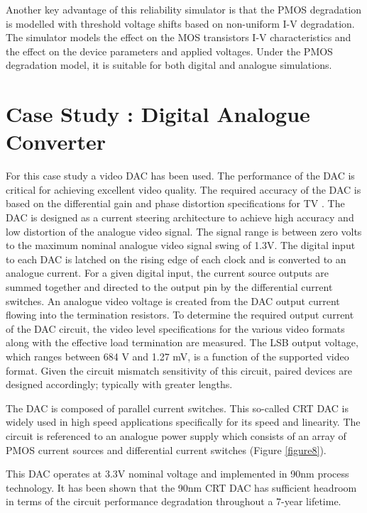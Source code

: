 \documentclass[11pt,a4paper]{article}
\begin{document}
Another key advantage of this reliability simulator is that the PMOS degradation is modelled with threshold voltage shifts based on  non-uniform I-V degradation. The simulator  models the effect on the MOS transistors I-V characteristics  and the effect on the device parameters and applied voltages. Under the PMOS degradation model, it is suitable for both  digital and analogue simulations.


\section{Case Study : Digital Analogue Converter}




For this case study a video DAC has been used. The performance of the DAC is critical for achieving excellent video quality. The required accuracy of the DAC is based on the differential gain and phase distortion specifications for TV \cite{Wu}. The DAC is designed as a current steering architecture to achieve high accuracy and low distortion of the analogue video signal. The signal range is between zero volts to the maximum nominal analogue video signal swing of 1.3V. The digital input to each DAC is latched on the rising edge of each clock and is converted to an analogue current. For a given digital input, the current source outputs are summed together and directed to the output pin by the differential current switches. An analogue video voltage is created from the DAC output current flowing into the termination resistors. To determine the required output current of the DAC circuit, the video level specifications for the various video formats along with the effective load termination are measured. The LSB output voltage, which ranges between 684 V and 1.27 mV, is a function of the supported video format.
Given the circuit mismatch sensitivity of this circuit, paired devices are designed accordingly; typically with greater lengths. 

The DAC  is composed of parallel current switches. This so-called CRT DAC is widely used in  high speed applications specifically for its speed and linearity. The circuit is referenced to an analogue power supply which consists of an array of PMOS current sources and differential current switches (Figure \ref{figure8}).

This DAC operates at 3.3V nominal voltage and implemented in 90nm process technology. It has been shown that the 90nm CRT DAC has sufficient headroom in terms of the circuit performance degradation throughout a 7-year lifetime.
\end{document}
